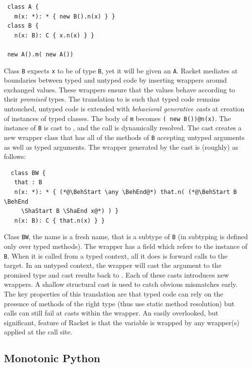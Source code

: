 \documentclass[a4paper,USenglish]{tex/lipics-v2016}
\newcommand{\code}[1]{{\tt #1}\xspace}
\begin{document}
\begin{lstlisting}
 class A {
   m(x: *): * { new B().n(x) } }
 class B {
   n(x: B): C { x.n(x) } }

 new A().m( new A())
\end{lstlisting}

\noindent Class \code B expects \code x to be of type \code B, yet it will
be given an \code A.  Racket mediates at boundaries between typed and
untyped code by inserting wrappers around exchanged values. These wrappers
ensure that the values behave according to their \emph{promised} types. The
translation to \kafka is such that typed code remains untouched, untyped
code is extended with \emph{behavioral generative casts} at creation of
instances of typed classes. The body of \code m becomes {\tt ({\BehStart
    \any \BehEnd}new B())@n(x)}.  The instance of \code B is cast to \any,
and the call is dynamically resolved. The cast creates a new wrapper class
that has all of the methods of \code B accepting untyped arguments as well
as typed arguments. The wrapper generated by the cast is (roughly) as
follows:

\begin{lstlisting}
  class BW {
   that : B
   n(x: *): * { (*@\BehStart \any \BehEnd@*) that.n( (*@\BehStart B \BehEnd
     \ShaStart B \ShaEnd x@*) ) }
   n(x: B): C { that.n(x) } }
\end{lstlisting}

\noindent Class \code{BW}, the name is a fresh name, that is a subtype of
\code B (in \kafka subtyping is defined only over typed methods).  The
wrapper has a field \that which refers to the instance of \code B. When it
is called from a typed context, all it does is forward calls to the
target. In an untyped context, the wrapper will cast the argument to the
promised type and cast results back to \any. Each of these casts introduces
new wrappers. A shallow structural cast is used to catch obvious mismatches
early.  The key properties of this translation are that typed code can rely
on the presence of methods of the right type (thus use static method
resolution) but calls can still fail at casts within the wrapper. An easily 
overlooked, but significant, feature of Racket is that the \this variable
is wrapped by any wrapper(s) applied at the call site.

\subsection{Monotonic Python}
\end{document}
